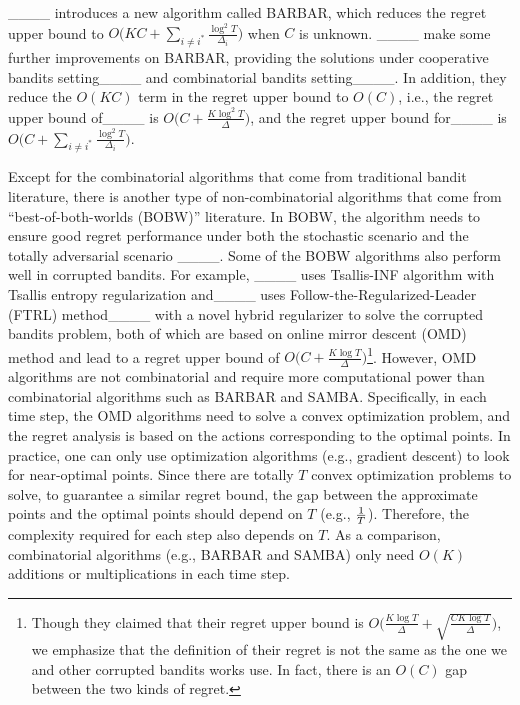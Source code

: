____ introduces a new algorithm called 
BARBAR, which reduces the regret upper bound to $O\big(KC+\sum_{i\neq i^*}\frac{\log^2 T}{\Delta_i}\big)$ when $C$ is unknown. 
%
____ make some further improvements on BARBAR, providing the solutions under cooperative bandits setting____ and combinatorial bandits setting____. In addition, they reduce the $O(KC)$ term in the regret upper bound to $O(C)$, i.e.,  the regret upper bound of____ is $O\big(C+\frac{K\log^2 T}{\Delta}\big)$, and the regret upper bound for____ is $O\big(C+\sum_{i\neq i^*}\frac{\log^2 T}{\Delta_{i}}\big)$.




Except for the combinatorial algorithms that come from traditional bandit literature, there is another type of non-combinatorial algorithms that come from ``best-of-both-worlds (BOBW)'' literature. In BOBW, the algorithm needs to ensure good regret performance under both the stochastic scenario %
and the totally adversarial scenario 
____. Some of the BOBW algorithms also perform well in corrupted bandits. For example, 
%
____ uses Tsallis-INF algorithm with Tsallis entropy regularization and____ uses Follow-the-Regularized-Leader (FTRL) method____ with a novel hybrid regularizer to solve the corrupted bandits problem, both of which are based on online mirror descent (OMD) method and lead to a regret upper bound of $O\big(C+\frac{K\log T}{\Delta}\big)$\footnote{Though they claimed that their regret upper bound is $O\big(\frac{K\log T}{\Delta}+\sqrt{\frac{CK\log T}{\Delta}}\big)$, we emphasize that the definition of their regret is not the same as the one we and other corrupted bandits works use. In fact, there is an $O(C)$ gap between the two kinds of regret.}. 
However, OMD algorithms are not combinatorial and require more computational power than combinatorial algorithms such as BARBAR and SAMBA. 
Specifically, in each time step, the OMD algorithms need to solve a convex optimization problem, and the regret analysis is based on the actions corresponding to the optimal points. 
%
In practice, one can only use optimization algorithms (e.g., gradient descent) to look for near-optimal points. 
%
Since there are totally $T$ convex optimization problems to solve, to guarantee a similar regret bound, the gap between the approximate points and the optimal points should depend on $T$ (e.g., ${1\over T}$).
%
Therefore, the complexity required for each step also depends on $T$. 
%
As a comparison, combinatorial algorithms (e.g., BARBAR and SAMBA) only need $O(K)$ additions or multiplications in each time step. 



